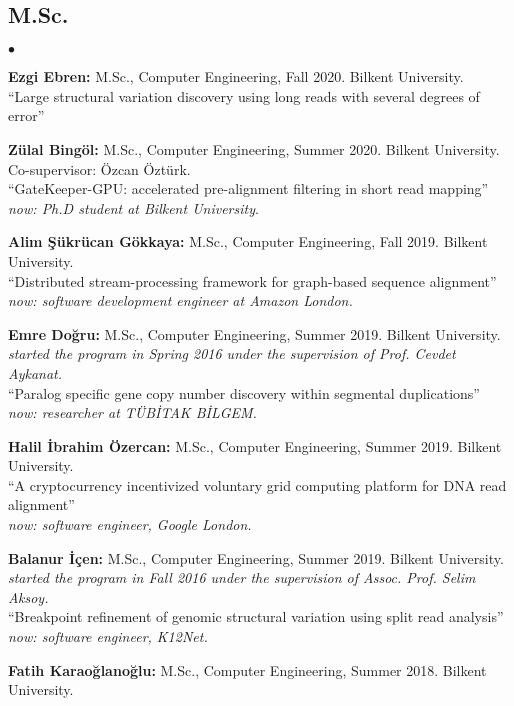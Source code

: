 \documentclass[margin,line]{res}
\newenvironment{list2}{
  \begin{list}{$\bullet$}{%
      \setlength{\itemsep}{0.1cm}
      \setlength{\parsep}{0in} \setlength{\parskip}{0in}
      \setlength{\topsep}{0in} \setlength{\partopsep}{0in} 
      \setlength{\leftmargin}{0.2in}}}{\end{list}}
\begin{document}
\begin{resume}
\subsection{\small \sc M.Sc.}
\begin{list2}
\item
  {\bf Ezgi Ebren:} M.Sc., Computer Engineering, Fall 2020. Bilkent University. \\
  ``Large structural variation discovery using long reads with several degrees of error''
\item
  {\bf Zülal Bingöl:} M.Sc., Computer Engineering, Summer 2020. Bilkent University. Co-supervisor: Özcan Öztürk.\\
  ``GateKeeper-GPU: accelerated pre-alignment filtering in short read mapping''\\
  {\it now: Ph.D student at Bilkent University}.
\item
  {\bf Alim Şükrücan Gökkaya:} M.Sc., Computer Engineering, Fall 2019.
  Bilkent University. \\
  ``Distributed stream-processing framework for graph-based sequence alignment''\\
  {\it now: software development engineer at Amazon London.}
\item
  {\bf Emre Doğru:} M.Sc., Computer Engineering, Summer 2019.
  Bilkent University. {\it started the program in Spring 2016 under the supervision of Prof. Cevdet Aykanat.}\\
  ``Paralog specific gene copy number discovery within segmental duplications''\\
  {\it now: researcher at TÜBİTAK BİLGEM.}
\item
  {\bf Halil İbrahim Özercan:} M.Sc., Computer Engineering, Summer 2019.
  Bilkent University. \\
  ``A cryptocurrency incentivized voluntary grid computing platform for DNA read alignment''\\
  {\it now: software engineer, Google London.}
\item
  {\bf Balanur İçen:} M.Sc., Computer Engineering, Summer 2019.
  Bilkent University. {\it started the program in Fall 2016 under the supervision of Assoc. Prof. Selim Aksoy.}\\
  ``Breakpoint refinement of genomic structural variation using split read analysis'' \\
  {\it now: software engineer, K12Net.}
\item
  {\bf Fatih Karaoğlanoğlu:} M.Sc., Computer Engineering, Summer 2018.
  Bilkent University. \\

\end{list2}
\end{resume}
\end{document}
